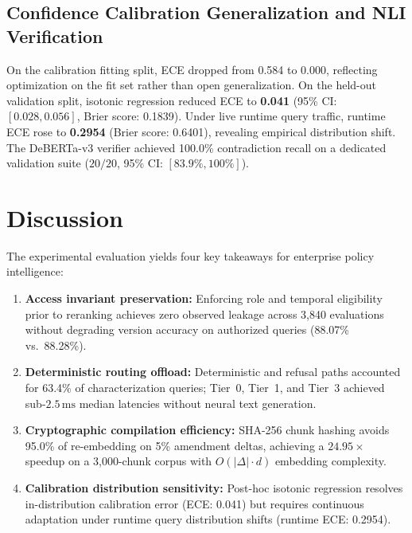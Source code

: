 \documentclass[journal]{IEEEtran}
\newcommand{\ms}{\,\mathrm{ms}}
\begin{document}
\subsection{Confidence Calibration Generalization and NLI Verification}
On the calibration fitting split, ECE dropped from 0.584 to 0.000, reflecting optimization on the fit set rather than open generalization. On the held-out validation split, isotonic regression reduced ECE to \textbf{0.041} (95\% CI: $[0.028, 0.056]$, Brier score: 0.1839). Under live runtime query traffic, runtime ECE rose to \textbf{0.2954} (Brier score: 0.6401), revealing empirical distribution shift. The DeBERTa-v3 verifier achieved 100.0\% contradiction recall on a dedicated validation suite ($20/20$, 95\% CI: $[83.9\%, 100\%]$).

\section{Discussion}

The experimental evaluation yields four key takeaways for enterprise policy intelligence:
\begin{enumerate}
  \setlength{\itemsep}{0pt}\setlength{\parsep}{0pt}\setlength{\topsep}{0.5pt}
  \item \textbf{Access invariant preservation:} Enforcing role and temporal eligibility prior to reranking achieves zero observed leakage across 3,840 evaluations without degrading version accuracy on authorized queries (88.07\% vs.\ 88.28\%).
  \item \textbf{Deterministic routing offload:} Deterministic and refusal paths accounted for 63.4\% of characterization queries; Tier~0, Tier~1, and Tier~3 achieved sub-$2.5\ms$ median latencies without neural text generation.
  \item \textbf{Cryptographic compilation efficiency:} SHA-256 chunk hashing avoids 95.0\% of re-embedding on 5\% amendment deltas, achieving a $24.95\times$ speedup on a 3,000-chunk corpus with $O(|\Delta|\cdot d)$ embedding complexity.
  \item \textbf{Calibration distribution sensitivity:} Post-hoc isotonic regression resolves in-distribution calibration error (ECE: 0.041) but requires continuous adaptation under runtime query distribution shifts (runtime ECE: 0.2954).
\end{enumerate}

\end{document}
